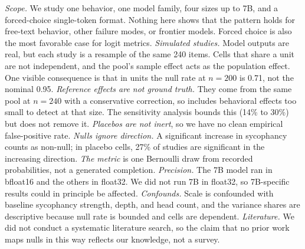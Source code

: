 \emph{Scope.} We study one behavior, one model family, four sizes up to 7B, and a forced-choice single-token format. Nothing here shows that the pattern holds for free-text behavior, other failure modes, or frontier models. Forced choice is also the most favorable case for logit metrics.
\emph{Simulated studies.} Model outputs are real, but each study is a resample of the same 240 items. Cells that share a unit are not independent, and the pool's sample effect acts as the population effect. One visible consequence is that in \noeff units the \mlogit null rate at $n = 200$ is 0.71, not the nominal 0.95.
\emph{Reference effects are not ground truth.} They come from the same pool at $n = 240$ with a conservative correction, so \latent includes behavioral effects too small to detect at that size. The sensitivity analysis bounds this (14\% to 30\%) but does not remove it.
\emph{Placebos are not inert}, so we have no clean empirical false-positive rate.
\emph{Nulls ignore direction.} A significant increase in sycophancy counts as non-null; in placebo cells, 27\% of \mlogit studies are significant in the increasing direction.
\emph{The \msample metric} is one Bernoulli draw from recorded probabilities, not a generated completion.
\emph{Precision.} The 7B model ran in bfloat16 and the others in float32. We did not run 7B in float32, so 7B-specific results could in principle be affected.
\emph{Confounds.} Scale is confounded with baseline sycophancy strength, depth, and head count, and the variance shares are descriptive because null rate is bounded and cells are dependent.
\emph{Literature.} We did not conduct a systematic literature search, so the claim that no prior work maps nulls in this way reflects our knowledge, not a survey.
